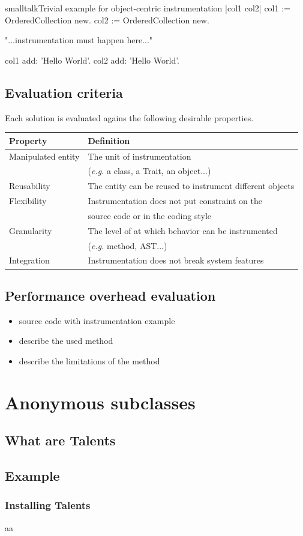 \documentclass[10pt,twoside,english]{_support/latex/sbabook/sbabook}
\begin{document}
\begin{listing}[float, label=motivation-example]{smalltalk}{Trivial example for object-centric instrumentation}
|col1 col2|
col1 := OrderedCollection new.
col2 := OrderedCollection new.

"...instrumentation must happen here..."

col1 add: 'Hello World'.
col2 add: 'Hello World'.
\end{listing}
\section{Evaluation criteria}
Each solution is evaluated agains the following desirable properties.

\begin{tabular}{ll}
\toprule
\textbf{Property} & \textbf{Definition} \\
\midrule
Manipulated entity & The unit of instrumentation \\
 & (\textit{e.g.} a class, a Trait, an object...) \\
Reusability & The entity can be reused to instrument different objects \\
Flexibility & Instrumentation does not put constraint on the \\
 & source code or in the coding style \\
Granularity & The level of at which behavior can be instrumented \\
 & (\textit{e.g.} method, AST...) \\
Integration & Instrumentation does not break system features \\
\bottomrule
\end{tabular}
\section{Performance overhead evaluation}
\begin{itemize}
\item source code with instrumentation example
\item describe the used method
\item describe the limitations of the method
\end{itemize}
\chapter{Anonymous subclasses}\section{What are Talents}\section{Example}\subsection{Installing Talents}
aa
\end{document}
